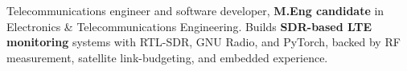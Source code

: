 Telecommunications engineer and software developer, \textbf{M.Eng candidate} in Electronics \& Telecommunications Engineering. Builds \textbf{SDR-based LTE monitoring} systems with RTL-SDR, GNU Radio, and PyTorch, backed by RF measurement, satellite link-budgeting, and embedded experience.
